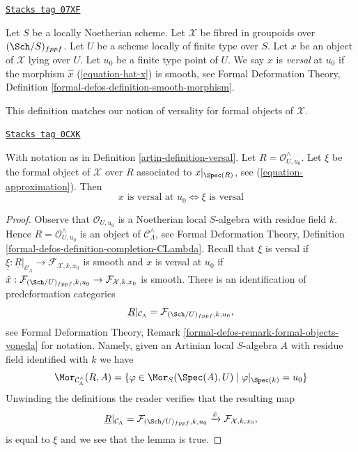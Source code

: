 \begin{definition}[Versal]
\label{artin-definition-versal}
\href{https://stacks.math.columbia.edu/tag/07XF}{\texttt{Stacks tag 07XF}}

Let $S$ be a locally Noetherian scheme.
Let $\mathcal{X}$ be fibred in groupoids over $(\Sch/S)_{fppf}$.
Let $U$ be a scheme locally of finite type over $S$.
Let $x$ be an object of $\mathcal{X}$ lying over $U$.
Let $u_0$ be a finite type point of $U$.
We say $x$ is {\it versal} at $u_0$ if the morphism $\hat x$
(\ref{equation-hat-x}) is smooth, see Formal Deformation Theory, Definition
\ref{formal-defos-definition-smooth-morphism}.
\end{definition}

This definition matches our notion of versality for formal objects of
$\mathcal{X}$.

\begin{lemma}
\label{artin-lemma-versality-matches}
\href{https://stacks.math.columbia.edu/tag/0CXK}{\texttt{Stacks tag 0CXK}}

With notation as in Definition \ref{artin-definition-versal}.
Let $R = \mathcal{O}_{U, u_0}^\wedge$.
Let $\xi$ be the formal object of $\mathcal{X}$
over $R$ associated to $x|_{\Spec(R)}$, see (\ref{equation-approximation}).
Then
$$
x\text{ is versal at }u_0
\Leftrightarrow
\xi\text{ is versal}
$$
\end{lemma}

\begin{proof}
Observe that $\mathcal{O}_{U, u_0}$ is a Noetherian local $S$-algebra
with residue field $k$. Hence $R = \mathcal{O}_{U, u_0}^\wedge$ is an object of
$\mathcal{C}_\Lambda^\wedge$, see Formal Deformation Theory, Definition
\ref{formal-defos-definition-completion-CLambda}.
Recall that $\xi$ is versal if
$\underline{\xi} : \underline{R}|_{\mathcal{C}_\Lambda} \to
\mathcal{F}_{\mathcal{X}, k, x_0}$
is smooth and $x$ is versal at $u_0$ if
$\hat x : \mathcal{F}_{(\Sch/U)_{fppf}, k, u_0}
\to \mathcal{F}_{\mathcal{X}, k, x_0}$ is smooth.
There is an identification of predeformation categories
$$
\underline{R}|_{\mathcal{C}_\Lambda}
=
\mathcal{F}_{(\Sch/U)_{fppf}, k, u_0},
$$
see Formal Deformation Theory, Remark
\ref{formal-defos-remark-formal-objects-yoneda} for notation.
Namely, given an Artinian local $S$-algebra $A$ with residue field
identified with $k$ we have
$$
\Mor_{\mathcal{C}_\Lambda^\wedge}(R, A) =
\{\varphi \in \Mor_S(\Spec(A), U) \mid \varphi|_{\Spec(k)} = u_0\}
$$
Unwinding the definitions the reader verifies that the resulting map
$$
\underline{R}|_{\mathcal{C}_\Lambda} =
\mathcal{F}_{(\Sch/U)_{fppf}, k, u_0}
\xrightarrow{\hat x}
\mathcal{F}_{\mathcal{X}, k, x_0},
$$
is equal to $\underline{\xi}$ and we see that the lemma is true.
\end{proof}

